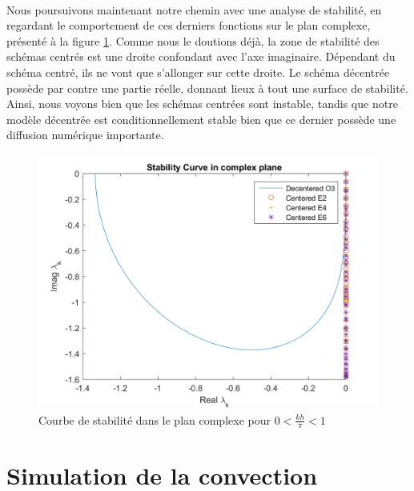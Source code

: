 \documentclass{article}
\begin{document}
\\
Nous poursuivons maintenant notre chemin avec une analyse de stabilité, en regardant le comportement de ces derniers fonctions sur le plan complexe, présenté à la figure \ref{fig2}. Comme nous le doutions déjà, la zone de stabilité des schémas centrés est une droite confondant avec l'axe imaginaire. Dépendant du schéma centré, ils ne vont que s'allonger sur cette droite. Le schéma décentrée possède par contre une partie réelle, donnant lieux à tout une surface de stabilité. Ainsi, nous voyons bien que les schémas centrées sont instable, tandis que notre modèle décentrée est conditionnellement stable bien que ce dernier possède une diffusion numérique importante.  \\
\begin{figure}[H]
    \centering
    \includegraphics[scale=0.5]{img/fig2.png}
    \caption{Courbe de stabilité dans le plan complexe pour $0 < \frac{kh}{\pi} < 1$}
    \label{fig2}
\end{figure}

\newpage
\section{Simulation de la convection}
\end{document}
